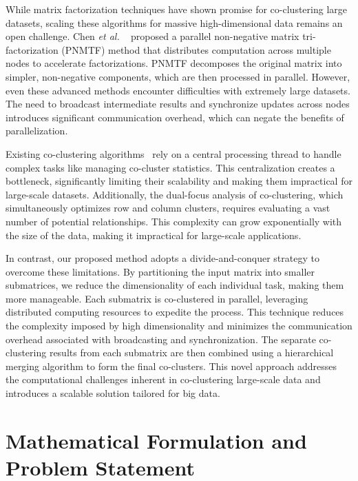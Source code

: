 \documentclass[journal]{IEEEtran}
\renewcommand{\cite}[1]{~\autocite{#1}}
\begin{document}
While matrix factorization techniques have shown promise for co-clustering large datasets, scaling these algorithms for massive high-dimensional data remains an open challenge. Chen \textit{et al.} \cite{chen2023ParallelNonNegativeMatrix} proposed a parallel non-negative matrix tri-factorization (PNMTF) method that distributes computation across multiple nodes to accelerate factorizations. PNMTF decomposes the original matrix into simpler, non-negative components, which are then processed in parallel. However, even these advanced methods encounter difficulties with extremely large datasets. The need to broadcast intermediate results and synchronize updates across nodes introduces significant communication overhead, which can negate the benefits of parallelization.

Existing co-clustering algorithms\cite{chen2023ParallelNonNegativeMatrix, cheng2015CoClusterDDistributedFramework} rely on a central processing thread to handle complex tasks like managing co-cluster statistics. This centralization creates a bottleneck, significantly limiting their scalability and making them impractical for large-scale datasets. Additionally, the dual-focus analysis of co-clustering, which simultaneously optimizes row and column clusters, requires evaluating a vast number of potential relationships. This complexity can grow exponentially with the size of the data, making it impractical for large-scale applications.

In contrast, our proposed method adopts a divide-and-conquer strategy to overcome these limitations. By partitioning the input matrix into smaller submatrices, we reduce the dimensionality of each individual task, making them more manageable. Each submatrix is co-clustered in parallel, leveraging distributed computing resources to expedite the process. This technique reduces the complexity imposed by high dimensionality and minimizes the communication overhead associated with broadcasting and synchronization. The separate co-clustering results from each submatrix are then combined using a hierarchical merging algorithm to form the final co-clusters. This novel approach addresses the computational challenges inherent in co-clustering large-scale data and introduces a scalable solution tailored for big data.

\section{Mathematical Formulation and Problem Statement}\label{sec:formula}
\end{document}

